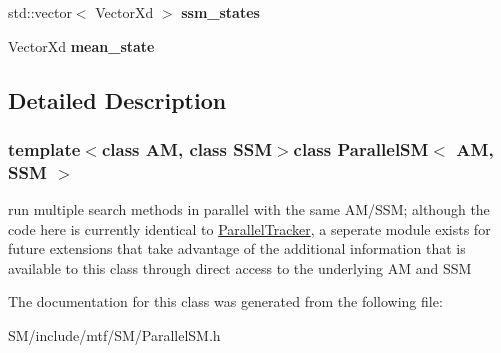 \begin{DoxyCompactItemize}
\item 
\hypertarget{classParallelSM_aa9070fb57a74a0ded4450de0b3fafe28}{std\-::vector$<$ Vector\-Xd $>$ {\bfseries ssm\-\_\-states}}\label{classParallelSM_aa9070fb57a74a0ded4450de0b3fafe28}

\item 
\hypertarget{classParallelSM_ae6a0c2dd5bd1cfc9180dedbd7f5ae398}{Vector\-Xd {\bfseries mean\-\_\-state}}\label{classParallelSM_ae6a0c2dd5bd1cfc9180dedbd7f5ae398}

\end{DoxyCompactItemize}


\subsection{Detailed Description}
\subsubsection*{template$<$class A\-M, class S\-S\-M$>$class Parallel\-S\-M$<$ A\-M, S\-S\-M $>$}

run multiple search methods in parallel with the same A\-M/\-S\-S\-M; although the code here is currently identical to \hyperlink{classParallelTracker}{Parallel\-Tracker}, a seperate module exists for future extensions that take advantage of the additional information that is available to this class through direct access to the underlying A\-M and S\-S\-M 

The documentation for this class was generated from the following file\-:\begin{DoxyCompactItemize}
\item 
S\-M/include/mtf/\-S\-M/Parallel\-S\-M.\-h\end{DoxyCompactItemize}
